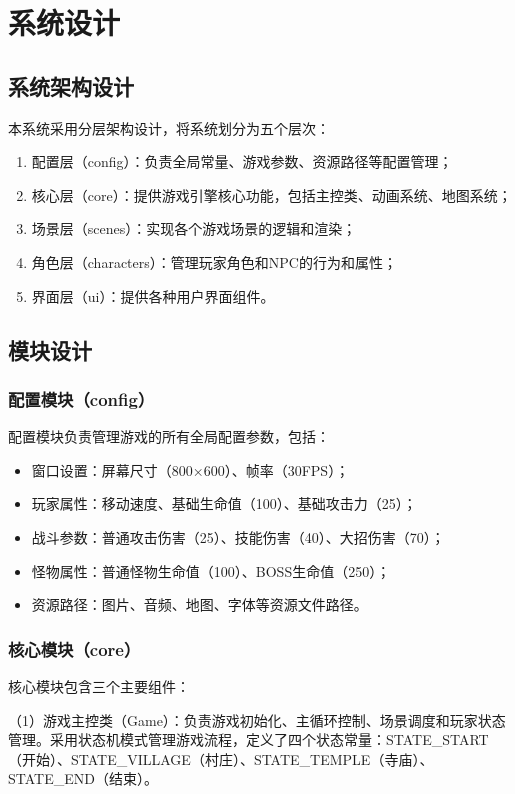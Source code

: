 \documentclass[a4paper,12pt]{article}
\begin{document}
\section{系统设计}

\subsection{系统架构设计}
本系统采用分层架构设计，将系统划分为五个层次：
\begin{enumerate}[label=(\arabic*)]
\item 配置层（config）：负责全局常量、游戏参数、资源路径等配置管理；
\item 核心层（core）：提供游戏引擎核心功能，包括主控类、动画系统、地图系统；
\item 场景层（scenes）：实现各个游戏场景的逻辑和渲染；
\item 角色层（characters）：管理玩家角色和NPC的行为和属性；
\item 界面层（ui）：提供各种用户界面组件。
\end{enumerate}

\subsection{模块设计}

\subsubsection{配置模块（config）}
配置模块负责管理游戏的所有全局配置参数，包括：
\begin{itemize}
\item 窗口设置：屏幕尺寸（800×600）、帧率（30FPS）；
\item 玩家属性：移动速度、基础生命值（100）、基础攻击力（25）；
\item 战斗参数：普通攻击伤害（25）、技能伤害（40）、大招伤害（70）；
\item 怪物属性：普通怪物生命值（100）、BOSS生命值（250）；
\item 资源路径：图片、音频、地图、字体等资源文件路径。
\end{itemize}

\subsubsection{核心模块（core）}
核心模块包含三个主要组件：

（1）游戏主控类（Game）：负责游戏初始化、主循环控制、场景调度和玩家状态管理。采用状态机模式管理游戏流程，定义了四个状态常量：STATE\_START（开始）、STATE\_VILLAGE（村庄）、STATE\_TEMPLE（寺庙）、STATE\_END（结束）。
\end{document}
